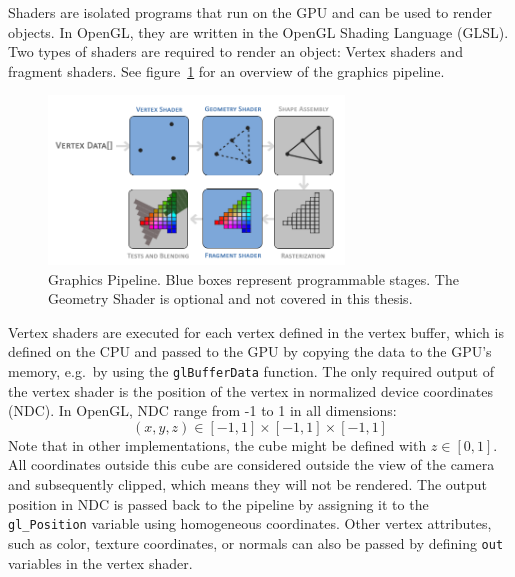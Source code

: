 Shaders are isolated programs that run on the GPU and can be used to render objects.
In OpenGL, they are written in the OpenGL Shading Language (GLSL).
Two types of shaders are required to render an object: Vertex shaders and fragment shaders.
See figure~\ref{fig:graphics-pipeline} for an overview of the graphics pipeline.
\begin{figure}[h!]
    \centering
    \includegraphics[width=0.70\textwidth]{images/graphics-pipeline}
    \caption{Graphics Pipeline. Blue boxes represent programmable stages. The Geometry Shader is optional and not covered in this thesis.}
    \label{fig:graphics-pipeline}
\end{figure}

Vertex shaders are executed for each vertex defined in the vertex buffer, which is defined on the CPU and
passed to the GPU by copying the data to the GPU's memory, e.g.\ by using the \texttt{glBufferData} function.
The only required output of the vertex shader is the position of the vertex in normalized device coordinates (NDC).
In OpenGL, NDC range from -1 to 1 in all dimensions:
\begin{equation}
    (x, y, z) \in [-1, 1] \times [-1, 1] \times [-1, 1]
\end{equation}
Note that in other implementations, the cube might be defined with $z \in [0, 1]$.
All coordinates outside this cube are considered outside the view of the camera and subsequently clipped,
which means they will not be rendered.
The output position in NDC is passed back to the pipeline by assigning it to the \texttt{gl\_Position}
variable using homogeneous coordinates.
Other vertex attributes, such as color, texture coordinates, or normals
can also be passed by defining \texttt{out} variables in the vertex shader.

